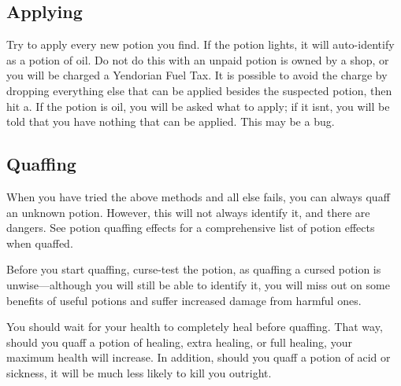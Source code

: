 \subsection{Applying}
\label{7}
Try to apply\footnotemark[167] every new potion you find. If the potion lights, it will auto-{}identify\footnotemark[168] as a potion of oil. Do not do this with an unpaid potion is owned by a shop, or you will be charged a Yendorian Fuel Tax\footnotemark[169]. It is possible to avoid the charge by dropping everything else that can be applied besides the suspected potion, then hit a\footnotemark[170]. If the potion is oil, you will be asked what to apply; if it isn\textquotesingle{}t, you will be told that you have nothing that can be applied. This may be a bug.



\subsection{Quaffing}
\label{8}
When you have tried the above methods and all else fails, you can always quaff an unknown potion. However, this will not always identify it, and there are dangers. See potion quaffing effects\footnotemark[171] for a comprehensive list of potion effects when quaffed.


Before you start quaffing, curse-{}test\footnotemark[172] the potion, as quaffing a cursed potion is unwise{\mbox{$\text{---}$}}although you will still be able to identify it, you will miss out on some benefits of useful potions and suffer increased damage from harmful ones.


You should wait for your health\footnotemark[173] to completely heal before quaffing. That way, should you quaff a potion of healing\footnotemark[174], extra healing\footnotemark[175], or full healing\footnotemark[176], your maximum health will increase. In addition, should you quaff a potion of acid\footnotemark[177] or sickness\footnotemark[178], it will be much less likely to kill you outright.



